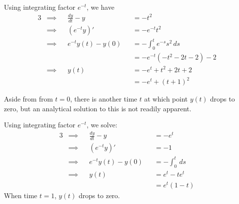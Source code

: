 \documentclass[a4paper]{article}
\begin{document}

Using integrating factor \(e^{-t}\), we have
\begin{alignat*}{3}
	&\implies && \frac{d y}{d t} - y && = -t^{2} \\
	&\implies && \!\left( e^{-t}y \right)' && = -e^{-t}t^{2} \\ 
	&\implies && e^{-t} y \!\left( t \right) - y \!\left( 0 \right) && = -\int^{t}_{0} e^{-s}s^{2} \, ds \\
	& && && = -e^{-t} \!\left( -t^{2} - 2t - 2 \right) - 2 \\
	&\implies && y \!\left( t \right) && = -e^{t} + t^{2} + 2t + 2 \\
	& && && = -e^{t} + \!\left( t + 1 \right)^{2}
\end{alignat*}

Aside from from \(t = 0\), there is another time \(t\) at which point \(y \!\left( t \right) \) drops to zero, but an analytical solution to this is not readily apparent.

\vspace{12pt}


Using integrating factor \(e^{-t}\), we solve:
\begin{alignat*}{3}
	&\implies && \frac{d y}{d t} - y && = -e^{t} \\
	&\implies && \!\left( e^{-t}y \right)' && = -1 \\ 
	&\implies && e^{-t} y \!\left( t \right) - y \!\left( 0 \right)  && = -\int^{t}_{0}  \, ds \\
	&\implies && y \!\left( t \right) && = e^{t} - te^{t} \\
	& && && = e^{t} \!\left( 1 - t \right) 
\end{alignat*}
When time \(t = 1\), \(y \!\left( t \right) \) drops to zero.

\vspace{12pt}

\end{document}
